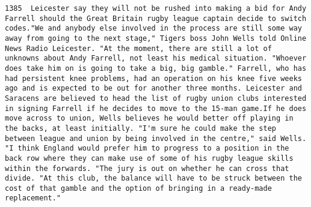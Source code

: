 \documentclass[11pt]{article}
\begin{document}
\begin{Verbatim}[commandchars=\\\{\}]
         1385  Leicester say they will not be rushed into making a bid for Andy Farrell should the Great Britain rugby league captain decide to switch codes."We and anybody else involved in the process are still some way away from going to the next stage," Tigers boss John Wells told Online News Radio Leicester. "At the moment, there are still a lot of unknowns about Andy Farrell, not least his medical situation. "Whoever does take him on is going to take a big, big gamble." Farrell, who has had persistent knee problems, had an operation on his knee five weeks ago and is expected to be out for another three months. Leicester and Saracens are believed to head the list of rugby union clubs interested in signing Farrell if he decides to move to the 15-man game.If he does move across to union, Wells believes he would better off playing in the backs, at least initially. "I'm sure he could make the step between league and union by being involved in the centre," said Wells. "I think England would prefer him to progress to a position in the back row where they can make use of some of his rugby league skills within the forwards. "The jury is out on whether he can cross that divide. "At this club, the balance will have to be struck between the cost of that gamble and the option of bringing in a ready-made replacement."                                                                                                                                                                                                                                                                                                                                                                                                                                                                                                                                                                                                                                                                                                                                                                                                                                                                                                                                                                                                                                                                                                                                                                                                                                                                                                                                                                                                                                                                                                                                                                                                                                                                                                                                                                                                                                                                                                                                                                                                                                                
\end{Verbatim}
\end{document}
